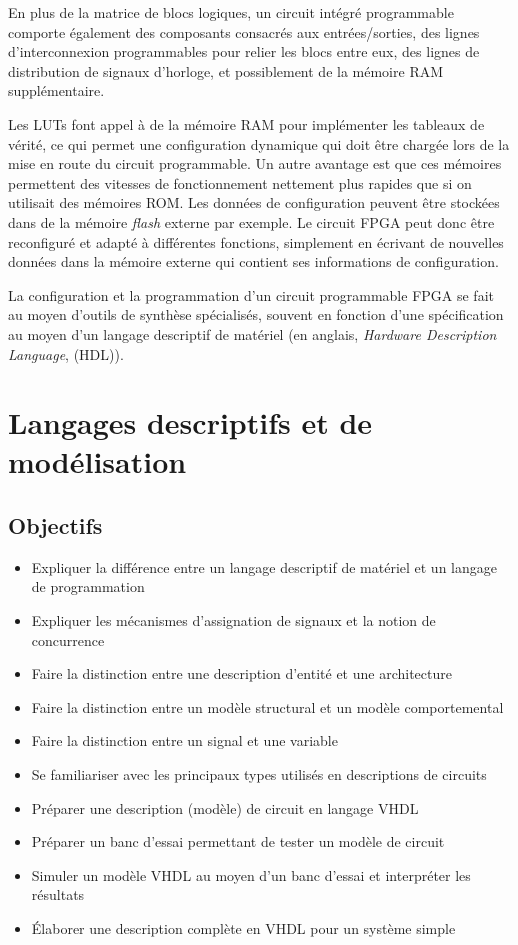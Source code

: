 \documentclass[11pt]{article}
\begin{document}
En plus de la matrice de blocs logiques, un circuit intégré
programmable comporte également des composants consacrés aux
entrées/sorties, des lignes d'interconnexion programmables pour relier
les blocs entre eux, des lignes de distribution de signaux d'horloge,
et possiblement de la mémoire RAM supplémentaire.

Les LUTs font appel à de la mémoire RAM pour implémenter les tableaux
de vérité, ce qui permet une configuration dynamique qui doit être
chargée lors de la mise en route du circuit programmable. Un autre
avantage est que ces mémoires permettent des vitesses de
fonctionnement nettement plus rapides que si on utilisait des mémoires
ROM.  Les données de configuration peuvent être stockées dans de la
mémoire \emph{flash} externe par exemple. Le circuit FPGA peut donc être
reconfiguré et adapté à différentes fonctions, simplement en écrivant
de nouvelles données dans la mémoire externe qui contient ses
informations de configuration.

La configuration et la programmation d'un circuit programmable FPGA se
fait au moyen d'outils de synthèse spécialisés, souvent en fonction
d'une spécification au moyen d'un langage descriptif de matériel (en
anglais, \emph{Hardware Description Language}, (HDL)).

\section{Langages descriptifs et de modélisation}
\label{sec:org6d290c4}

\subsection{Objectifs}
\label{sec:orgec479fe}
\begin{itemize}
\item Expliquer la différence entre un langage descriptif de matériel et
un langage de programmation
\item Expliquer les mécanismes d'assignation de signaux et la notion de concurrence
\item Faire la distinction entre une description d'entité et une architecture
\item Faire la distinction entre un modèle structural et un modèle
comportemental
\item Faire la distinction entre un signal et une variable
\item Se familiariser avec les principaux types utilisés en descriptions
de circuits
\item Préparer une description (modèle) de circuit en langage VHDL
\item Préparer un banc d'essai permettant de tester un modèle de circuit
\item Simuler un modèle VHDL au moyen d'un banc d'essai et interpréter les
résultats
\item Élaborer une description complète en VHDL pour un système simple
\end{itemize}
\end{document}
